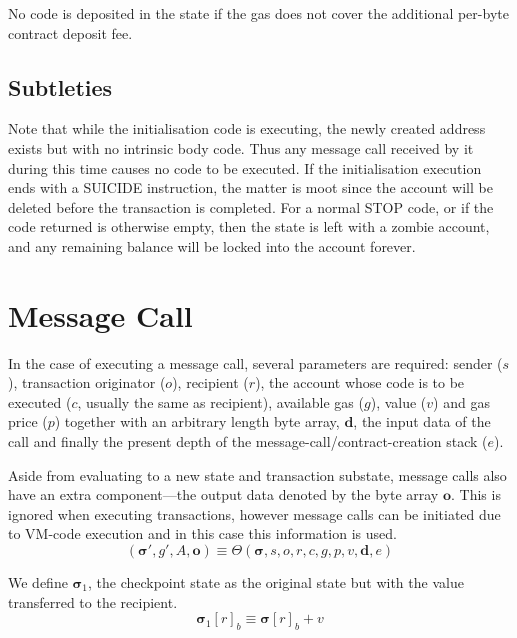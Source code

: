 \documentclass[9pt,oneside]{amsart}
\begin{document}
\begin{multicols}{2}
No code is deposited in the state if the gas does not cover the additional per-byte contract deposit fee.

\subsection{Subtleties}
Note that while the initialisation code is executing, the newly created address exists but with no intrinsic body code. Thus any message call received by it during this time causes no code to be executed. If the initialisation execution ends with a {\small SUICIDE} instruction, the matter is moot since the account will be deleted before the transaction is completed. For a normal {\small STOP} code, or if the code returned is otherwise empty, then the state is left with a zombie account, and any remaining balance will be locked into the account forever.

\section{Message Call} \label{ch:call}
In the case of executing a message call, several parameters are required: sender ($s$), transaction originator ($o$), recipient ($r$), the account whose code is to be executed ($c$, usually the same as recipient), available gas ($g$), value ($v$) and gas price ($p$) together with an arbitrary length byte array, $\mathbf{d}$, the input data of the call and finally the present depth of the message-call/contract-creation stack ($e$).

Aside from evaluating to a new state and transaction substate, message calls also have an extra component---the output data denoted by the byte array $\mathbf{o}$. This is ignored when executing transactions, however message calls can be initiated due to VM-code execution and in this case this information is used.
\begin{equation}
(\boldsymbol{\sigma}', g', A, \mathbf{o}) \equiv \Theta(\boldsymbol{\sigma}, s, o, r, c, g, p, v, \mathbf{d}, e)
\end{equation}

We define $\boldsymbol{\sigma}_1$, the checkpoint state as the original state but with the value transferred to the recipient.
\begin{equation}
\boldsymbol{\sigma}_1[r]_b \equiv \boldsymbol{\sigma}[r]_b + v
\end{equation}


\end{multicols}
\end{document}
